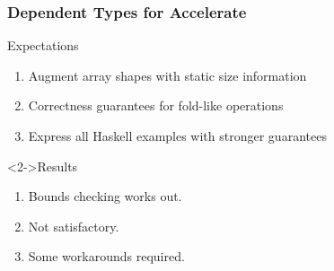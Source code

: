 \documentclass{beamer}
\begin{document}
\begin{frame}
  \frametitle{Dependent Types for Accelerate}
  \begin{block}{Expectations}
    \begin{enumerate}
    \item Augment array shapes with static size information
    \item Correctness guarantees for fold-like operations
    \item Express all Haskell examples with stronger guarantees
    \end{enumerate}
  \end{block}
  \begin{block}<2->{Results}
    \begin{enumerate}
    \item Bounds checking works out.
    \item Not satisfactory.
    \item Some workarounds required.
    \end{enumerate}
  \end{block}
\end{frame}
\end{document}
